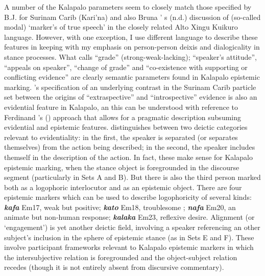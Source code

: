 \documentclass[output=paper]{langsci/langscibook}
\begin{document}
 
A number of the Kalapalo parameters seem to closely match those specified by B.J. \cite{Hoff1986} for Surinam Carib (Kari’na) and also Bruna \citeauthor{Franchetto}’ s (n.d.) discussion of  (so-called modal) ‘marker’s of true speech’ in the closely related Alto Xingu Kuikuro language.  However, with one exception, I use different language to describe these features in keeping with my emphasis on person-person deixis and dialogicality in stance processes.  What \citeauthor{Hoff1986} calls “grade” (strong-weak-lacking); “speaker’s attitude”, “appeals on speaker”, “change of grade” and “co-existence with supporting or conflicting evidence” are clearly semantic parameters found in Kalapalo epistemic marking.  \citeauthor{Hoff1986}’s specification of an underlying contrast in the Surinam Carib particle set between the origins of “extraspective” and  “introspective” evidence  is also an evidential feature in Kalapalo, an this can be understood with reference to Ferdinand \citeauthor{Haan2001}’s (\citeyear{Haan2001}) approach that allows for a pragmatic description subsuming evidential and epistemic features.  \citeauthor{Haan2001} distinguishes between two deictic categories relevant to evidentiality: in the first, the speaker is separated (or separates themselves) from the action being described; in the second, the speaker includes themself in the description of the action.
 In fact, these make sense for Kalapalo epistemic marking, when the stance object is foregrounded in the discourse segment  (particularly in Sets A and B). 
But there is also the third person marked both as a logophoric interlocutor and as an epistemic object.  There are four epistemic markers which can be used to describe logophoricity of several kinds: \textbf{\textit{kafa}} Em17, weak but positive; \textbf{\textit{kato}} Em18, troublesome ; \textbf{\textit{nafa}} Em20, an animate but non-human response; \textbf{\textit{kalaka}} Em23, reflexive desire.  Alignment (or ‘engagement’) is yet another deictic field,   involving a speaker referencing an other subject’s inclusion in the sphere of epistemic stance (as in Sets E and F). 
These involve participant frameworks relevant to Kalapalo epistemic markers in which the intersubjective relation is foregrounded and the object-subject relation recedes (though it is not entirely absent from discursive commentary). 
\end{document}

